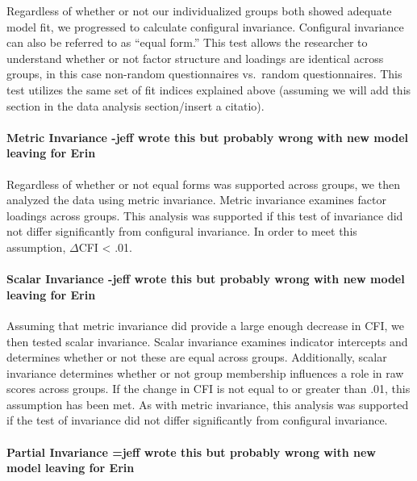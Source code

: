 \documentclass[man,draftall]{apa6}
\let\oldparagraph\paragraph
\renewcommand{\paragraph}[1]{\oldparagraph{#1}\mbox{}}
\begin{document}
Regardless of whether or not our individualized groups both showed adequate model fit, we progressed to calculate configural invariance. Configural invariance can also be referred to as \enquote{equal form.} This test allows the researcher to understand whether or not factor structure and loadings are identical across groups, in this case non-random questionnaires vs.~random questionnaires. This test utilizes the same set of fit indices explained above (assuming we will add this section in the data analysis section/insert a citatio).

\hypertarget{metric-invariance--jeff-wrote-this-but-probably-wrong-with-new-model-leaving-for-erin}{%
\paragraph{Metric Invariance -jeff wrote this but probably wrong with new model leaving for Erin}\label{metric-invariance--jeff-wrote-this-but-probably-wrong-with-new-model-leaving-for-erin}}

Regardless of whether or not equal forms was supported across groups, we then analyzed the data using metric invariance. Metric invariance examines factor loadings across groups. This analysis was supported if this test of invariance did not differ significantly from configural invariance. In order to meet this assumption, \(\Delta\)CFI \textless{} .01.

\hypertarget{scalar-invariance--jeff-wrote-this-but-probably-wrong-with-new-model-leaving-for-erin}{%
\paragraph{Scalar Invariance -jeff wrote this but probably wrong with new model leaving for Erin}\label{scalar-invariance--jeff-wrote-this-but-probably-wrong-with-new-model-leaving-for-erin}}

Assuming that metric invariance did provide a large enough decrease in CFI, we then tested scalar invariance. Scalar invariance examines indicator intercepts and determines whether or not these are equal across groups. Additionally, scalar invariance determines whether or not group membership influences a role in raw scores across groups. If the change in CFI is not equal to or greater than .01, this assumption has been met. As with metric invariance, this analysis was supported if the test of invariance did not differ significantly from configural invariance.

\hypertarget{partial-invariance-jeff-wrote-this-but-probably-wrong-with-new-model-leaving-for-erin}{%
\paragraph{Partial Invariance =jeff wrote this but probably wrong with new model leaving for Erin}\label{partial-invariance-jeff-wrote-this-but-probably-wrong-with-new-model-leaving-for-erin}}
\end{document}
